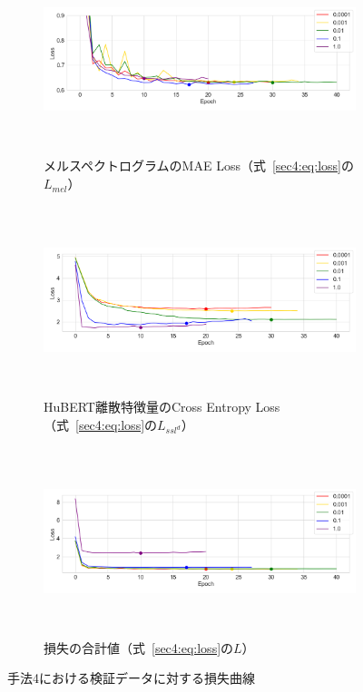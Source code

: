 \documentclass[12pt]{jarticle}
\numberwithin{equation}{section}    %
\numberwithin{figure}{section}      %
\numberwithin{table}{section}      %
\begin{document}
\begin{figure}[bt]
    \centering
    \begin{subfigure}{\linewidth}
        \centering
        \includegraphics[height=55mm]{./figure/sec4/loss_curve/4/mel_loss.png}
        \caption{メルスペクトログラムのMAE Loss（式~\eqref{sec4:eq:loss}の$L_{mel}$）}
        \label{sec4:fig:method_4_val_mel_loss}
    \end{subfigure}
    \begin{subfigure}{\linewidth}
        \centering
        \includegraphics[height=55mm]{./figure/sec4/loss_curve/4/ssl_feature_cluster_loss.png}
        \caption{HuBERT離散特徴量のCross Entropy Loss（式~\eqref{sec4:eq:loss}の$L_{ssl^{d}}$）}
        \label{sec4:fig:method_4_val_ssl_feature_cluster_loss}
    \end{subfigure}
    \begin{subfigure}{\linewidth}
        \centering
        \includegraphics[height=55mm]{./figure/sec4/loss_curve/4/total_loss.png}
        \caption{損失の合計値（式~\eqref{sec4:eq:loss}の$L$）}
        \label{sec4:fig:method_4_val_total_loss}
    \end{subfigure}
    \caption{手法4における検証データに対する損失曲線}
    \label{sec4:fig:method_4_val_losses}
\end{figure}
\end{document}
